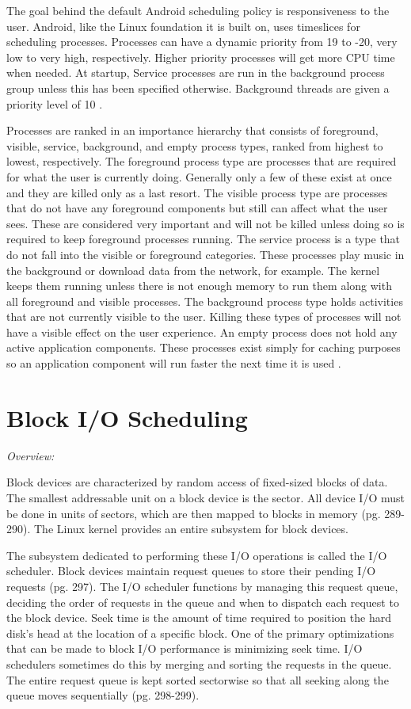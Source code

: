 \documentclass[letterpaper,10pt,titlepage]{article}
\newcommand{\tab}{\hspace*{2em}} %
\begin{document}
\tab The goal behind the default Android scheduling policy is responsiveness to the user. Android, like the Linux foundation it is built on, uses timeslices for scheduling processes. Processes can have a dynamic priority from 19 to -20, very low to very high, respectively. Higher priority processes will get more CPU time when needed. At startup, Service processes are run in the background process group unless this has been specified otherwise. Background threads are given a priority level of 10 \cite{gomo}.

\tab Processes are ranked in an importance hierarchy that consists of foreground, visible, service, background, and empty process types, ranked from highest to lowest, respectively. The foreground process type are processes that are required for what the user is currently doing. Generally only a few of these exist at once and they are killed only as a last resort. The visible process type are processes that do not have any foreground components but still can affect what the user sees. These are considered very important and will not be killed unless doing so is required to keep foreground processes running. The service process is a type that do not fall into the visible or foreground categories. These processes play music in the background or download data from the network, for example. The kernel keeps them running unless there is not enough memory to run them along with all foreground and visible processes. The background process type holds activities that are not currently visible to the user. Killing these types of processes will not have a visible effect on the user experience. An empty process does not hold any active application components. These processes exist simply for caching purposes so an application component will run faster the next time it is used \cite{AndroidDev1}.

\newpage
\section{Block I/O Scheduling}

\emph{Overview:} 

\tab Block devices are characterized by random access of fixed-sized blocks of data. The smallest addressable unit on a block device is the sector. All device I/O must be done in units of sectors, which are then mapped to blocks in memory \cite{Love}(pg. 289-290). The Linux kernel provides an entire subsystem for block devices. 

\tab The subsystem dedicated to performing these I/O operations is called the I/O scheduler. Block devices maintain request queues to store their pending I/O requests \cite{Love}(pg. 297). The I/O scheduler functions by managing this request queue, deciding the order of requests in the queue and when to dispatch each request to the block device. Seek time is the amount of time required to position the hard disk's head at the location of a specific block. One of the primary optimizations that can be made to block I/O performance is minimizing seek time. I/O schedulers sometimes do this by merging and sorting the requests in the queue. The entire request queue is kept sorted sectorwise so that all seeking along the queue moves sequentially \cite{Love}(pg. 298-299). 
\end{document}
